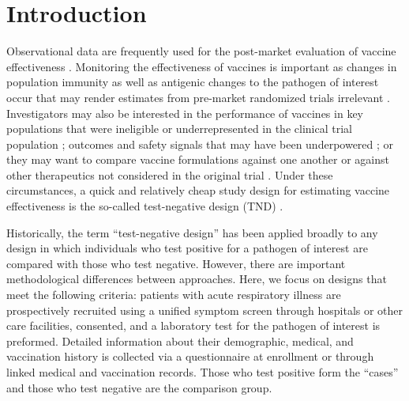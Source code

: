 \documentclass[11pt]{article}
\begin{document}
\doublespacing

\section{Introduction} \label{sec:introduction}
Observational data are frequently used for the post-market evaluation of vaccine effectiveness \cite{chua_use_2020-1,dean_covid-19_2021,patel_postlicensure_2020}. Monitoring the effectiveness of vaccines is important as changes in population immunity as well as antigenic changes to the pathogen of interest occur that may render estimates from pre-market randomized trials irrelevant \cite{hitchings_effectiveness_2021,israel_elapsed_2021}. Investigators may also be interested in the performance of vaccines in key populations that were ineligible or underrepresented in the clinical trial population \cite{olson_effectiveness_2022}; outcomes and safety signals that may have been underpowered \cite{thompson_effectiveness_2021}; or they may want to compare vaccine formulations against one another or against other therapeutics not considered in the original trial \cite{skowronski_two-dose_2022}. Under these circumstances, a quick and relatively cheap study design for estimating vaccine effectiveness is the so-called test-negative design (TND) \cite{sullivan_potential_2014,jackson_test-negative_2013}. 
 
Historically, the term ``test-negative design'' has been applied broadly to any design in which individuals who test positive for a pathogen of interest are compared with those who test negative. However, there are important methodological differences between approaches. Here, we focus on designs that meet the following criteria: patients with acute respiratory illness are prospectively recruited using a unified symptom screen through hospitals or other care facilities, consented, and a laboratory test for the pathogen of interest is preformed. Detailed information about their demographic, medical, and vaccination history is collected via a questionnaire at enrollment or through linked medical and vaccination records. Those who test positive form the ``cases'' and those who test negative are the comparison group. 
\end{document}
